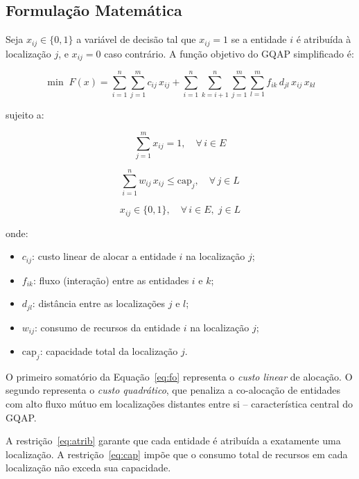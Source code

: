 \documentclass[12pt]{article}
\begin{document}
\subsection{Formulação Matemática}

Seja $x_{ij} \in \{0,1\}$ a variável de decisão tal que $x_{ij} = 1$ se a
entidade $i$ é atribuída à localização $j$, e $x_{ij} = 0$ caso contrário.
A função objetivo do GQAP simplificado é:

\begin{equation}
\min \; F(x) = \sum_{i=1}^{n} \sum_{j=1}^{m} c_{ij} \, x_{ij}
             + \sum_{i=1}^{n} \sum_{k=i+1}^{n} \sum_{j=1}^{m} \sum_{l=1}^{m}
               f_{ik} \, d_{jl} \, x_{ij} \, x_{kl}
\label{eq:fo}
\end{equation}

\noindent sujeito a:

\begin{equation}
\sum_{j=1}^{m} x_{ij} = 1, \quad \forall \, i \in E
\label{eq:atrib}
\end{equation}

\begin{equation}
\sum_{i=1}^{n} w_{ij} \, x_{ij} \leq \text{cap}_j, \quad \forall \, j \in L
\label{eq:cap}
\end{equation}

\begin{equation}
x_{ij} \in \{0, 1\}, \quad \forall \, i \in E, \; j \in L
\label{eq:bin}
\end{equation}

onde:
\begin{itemize}
  \item $c_{ij}$: custo linear de alocar a entidade $i$ na localização $j$;
  \item $f_{ik}$: fluxo (interação) entre as entidades $i$ e $k$;
  \item $d_{jl}$: distância entre as localizações $j$ e $l$;
  \item $w_{ij}$: consumo de recursos da entidade $i$ na localização $j$;
  \item $\text{cap}_j$: capacidade total da localização $j$.
\end{itemize}

O primeiro somatório da Equação~\ref{eq:fo} representa o \textit{custo linear}
de alocação. O segundo representa o \textit{custo quadrático}, que penaliza a
co-alocação de entidades com alto fluxo mútuo em localizações distantes entre
si -- característica central do GQAP.

A restrição~\ref{eq:atrib} garante que cada entidade é atribuída a exatamente
uma localização. A restrição~\ref{eq:cap} impõe que o consumo total de recursos
em cada localização não exceda sua capacidade.
\end{document}

